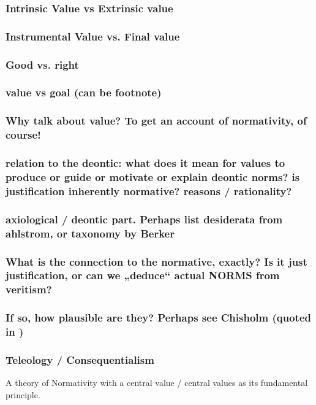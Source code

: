 \documentclass[12pt,numbers=noenddot]{scrartcl}
\begin{document}
\subsubsection{ Intrinsic Value vs Extrinsic value }
\subsubsection{ Instrumental Value vs. Final value }
\subsubsection{ Good vs. right }
\subsubsection{ value vs goal (can be footnote)}
\subsubsection{ Why talk about value? To get an account of normativity, of course! }
\subsubsection{ relation to the deontic: what does it mean for values to produce or guide or motivate or explain deontic norms? is justification inherently normative? reasons / rationality? }
\subsubsection{ axiological / deontic part. Perhaps list desiderata from ahlstrom, or taxonomy by Berker}

\subsubsection{ What is the connection to the normative, exactly? Is it just justification, or can we „deduce“ actual NORMS from veritism? }
\subsubsection{ If so, how plausible are they? Perhaps see Chisholm (quoted in \textcite{Goldman2002-GOLTUO-2})}

\subsubsection{ Teleology / Consequentialism} \label{subsec: teleology}
A theory of Normativity with a central value / central values as its fundamental principle.
\end{document}
